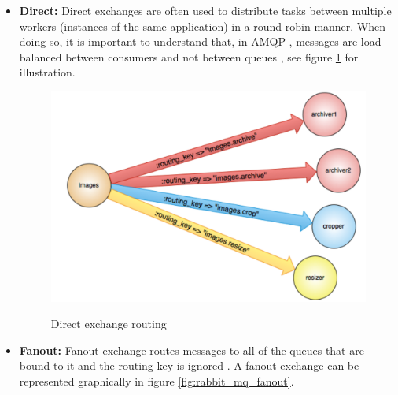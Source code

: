 \begin{itemize}
\item{\textbf{Direct:}} Direct exchanges are often used to distribute tasks between multiple workers (instances of the same application) in a round robin manner. When doing so, it is important to understand that, in \ac{AMQP} , messages are load balanced between consumers and not between queues \cite{amqp-concepts}, see figure \ref{fig:rabbit_mq_direct} for illustration.

\begin{figure}[htb]
  \centering
  \includegraphics[scale=0.6]{rabbit_mq_direct.png}\\
  \caption{Direct exchange routing}
  \label{fig:rabbit_mq_direct}
  \protect\cite{amqp-concepts}
\end{figure}

\item{\textbf{Fanout:}} Fanout exchange routes messages to all of the queues that are bound to it and the routing key is ignored \cite{amqp-concepts}. A fanout exchange can be represented graphically in figure \ref{fig:rabbit_mq_fanout}.



\end{itemize}
